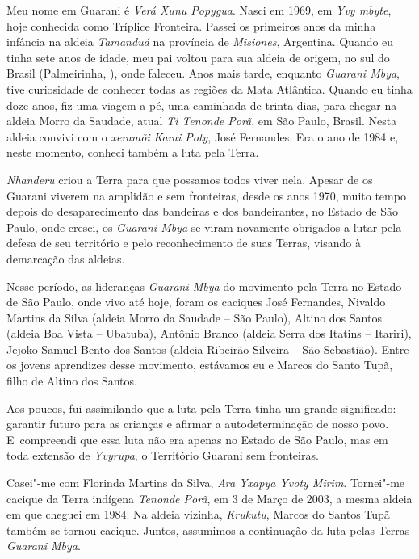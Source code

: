  


 


 

Meu nome em Guarani é \emph{Verá Xunu Popygua}. Nasci em 1969, em
\emph{Yvy mbyte}, hoje conhecida como Tríplice Fronteira. Passei os
primeiros anos da minha infância na aldeia \emph{Tamanduá} na província
de \emph{Misiones}, Argentina. Quando eu tinha sete anos de idade, meu
pai voltou para sua aldeia de origem, no sul do Brasil (Palmeirinha,
), onde faleceu. Anos mais tarde, enquanto \emph{Guarani Mbya}, tive
curiosidade de conhecer todas as regiões da Mata Atlântica. Quando eu
tinha doze anos, fiz uma viagem a pé, uma caminhada de trinta dias, para
chegar na aldeia Morro da Saudade, atual \emph{Ti Tenonde Porã}, em São
Paulo, Brasil. Nesta aldeia convivi com o \emph{xeramõi} \emph{Karai
Poty}, José Fernandes. Era o ano de 1984 e, neste momento, conheci
também a luta pela Terra.

\emph{Nhanderu} criou a Terra para que possamos todos viver nela. Apesar
de os Guarani viverem na amplidão e sem fronteiras, desde os anos 1970,
muito tempo depois do desaparecimento das bandeiras e dos bandeirantes,
no Estado de São Paulo, onde cresci, os \emph{Guarani Mbya} se viram
novamente obrigados a lutar pela defesa de seu território e pelo
reconhecimento de suas Terras, visando à demarcação das aldeias.

 

Nesse período, as lideranças \emph{Guarani Mbya} do movimento pela Terra
no Estado de São Paulo, onde vivo até hoje, foram os caciques José
Fernandes, Nivaldo Martins da Silva (aldeia Morro da Saudade -- São
Paulo), Altino dos Santos (aldeia Boa Vista -- Ubatuba), Antônio Branco
(aldeia Serra dos Itatins -- Itariri), Jejoko Samuel Bento dos Santos
(aldeia Ribeirão Silveira -- São Sebastião). Entre os jovens aprendizes
desse movimento, estávamos eu e Marcos do Santo Tupã, filho de Altino
dos Santos.

Aos poucos, fui assimilando que a luta pela Terra tinha um grande
significado: garantir futuro para as crianças e afirmar a
autodeterminação de nosso povo. E~compreendi que essa luta não era
apenas no Estado de São Paulo, mas em toda extensão de \emph{Yvyrupa}, o
Território Guarani sem fronteiras.

Casei"-me com Florinda Martins da Silva, \emph{Ara Yxapya Yvoty Mirim}.
Tornei"-me cacique da Terra indígena \emph{Tenonde Porã}, em 3 de Março
de 2003, a mesma aldeia em que cheguei em 1984. Na aldeia vizinha,
\emph{Krukutu}, Marcos do Santos Tupã também se tornou cacique. Juntos,
assumimos a continuação da luta pelas Terras \emph{Guarani Mbya}.

 

 
